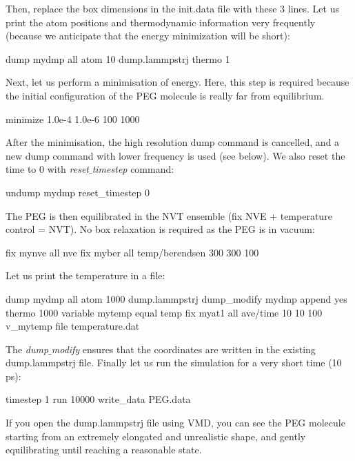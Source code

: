 \noindent Then, replace the box dimensions in the init.data file with
these 3 lines.
Let us print the atom positions and thermodynamic
information very frequently (because we anticipate that the
energy minimization will be short):

\begin{lcverbatim}
dump mydmp all atom 10 dump.lammpstrj
thermo 1
\end{lcverbatim}

\noindent Next, let us perform a minimisation of energy. Here, this
step is required because the initial configuration of the
PEG molecule is really far from equilibrium.

\begin{lcverbatim}
minimize 1.0e-4 1.0e-6 100 1000
\end{lcverbatim}

\noindent After the minimisation, the high resolution dump command is
cancelled, and a new dump command with lower frequency is
used (see below). We also reset the time to 0 with
\textit{reset$\_$timestep} command:

\begin{lcverbatim}
undump mydmp
reset_timestep 0
\end{lcverbatim}

\noindent The PEG is then equilibrated in the NVT ensemble (fix NVE +
temperature control = NVT). No box relaxation is required as
the PEG is in vacuum:

\begin{lcverbatim}
fix mynve all nve
fix myber all temp/berendsen 300 300 100
\end{lcverbatim}

\noindent Let us print the temperature in a file:

\begin{lcverbatim}
dump mydmp all atom 1000 dump.lammpstrj
dump_modify mydmp append yes
thermo 1000
variable mytemp equal temp
fix myat1 all ave/time 10 10 100 v_mytemp file temperature.dat
\end{lcverbatim}

\noindent The \textit{dump$\_$modify} ensures that the coordinates are written 
in the existing dump.lammpstrj file. 
Finally let us run the simulation for a very short time (10 ps):

\begin{lcverbatim}
timestep 1
run 10000
write_data PEG.data
\end{lcverbatim}

\noindent If you open the dump.lammpstrj file
using VMD, you can see the PEG molecule starting from
an extremely elongated and unrealistic shape, and 
gently equilibrating until reaching a reasonable state.

